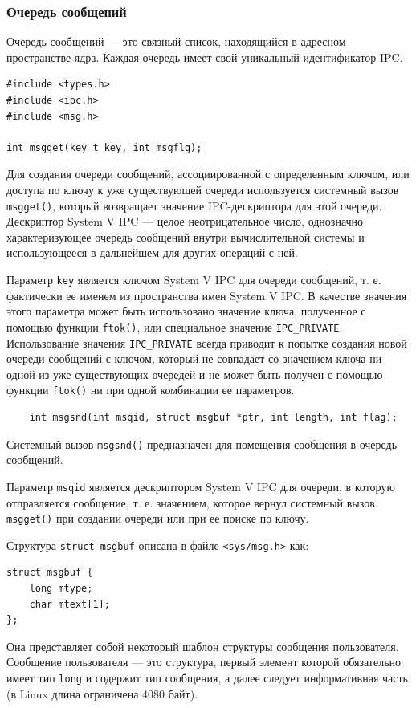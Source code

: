\documentclass[a4paper,14pt]{extarticle}
\begin{document}
\subsubsection{Очередь сообщений}
Очередь сообщений — это связный список, находящийся в адресном пространстве ядра. Каждая очередь имеет свой уникальный идентификатор IPC.

\begin{verbatim}
#include <types.h>
#include <ipc.h>
#include <msg.h>

int msgget(key_t key, int msgflg);
\end{verbatim}

Для создания очереди сообщений, ассоциированной с определенным ключом, или доступа по ключу к уже существующей очереди используется системный вызов \verb|msgget()|, который возвращает значение IPC-дескриптора для этой очереди. Дескриптор System V IPC --- целое неотрицательное число, однозначно характеризующее очередь сообщений внутри вычислительной системы и использующееся в дальнейшем для других операций с ней.

Параметр \verb|key| является ключом System V IPC для очереди сообщений, т. е. фактически ее именем из пространства имен System V IPC. В качестве значения этого параметра может быть использовано значение ключа, полученное с помощью функции \verb|ftok()|, или специальное значение \verb|IPC_PRIVATE|. Использование значения \verb|IPC_PRIVATE| всегда приводит к попытке создания новой очереди сообщений с ключом, который не совпадает со значением ключа ни одной из уже существующих очередей и не может быть получен с помощью функции \verb|ftok()| ни при одной комбинации ее параметров.
\begin{verbatim}
    int msgsnd(int msqid, struct msgbuf *ptr, int length, int flag);
\end{verbatim}

Системный вызов \verb|msgsnd()| предназначен для помещения сообщения в очередь сообщений.

Параметр \verb|msqid| является дескриптором System V IPC для очереди, в которую отправляется сообщение, т. е. значением, которое вернул системный вызов \verb|msgget()| при создании очереди или при ее поиске по ключу.

Структура \verb|struct msgbuf| описана в файле \verb|<sys/msg.h>| как:
\begin{verbatim}
struct msgbuf {
    long mtype;
    char mtext[1];
};
\end{verbatim}
Она представляет собой некоторый шаблон структуры сообщения пользователя. Сообщение пользователя --- это структура, первый элемент которой обязательно имеет тип \verb|long| и содержит тип сообщения, а далее следует информативная часть (в Linux длина ограничена 4080 байт).
\end{document}
